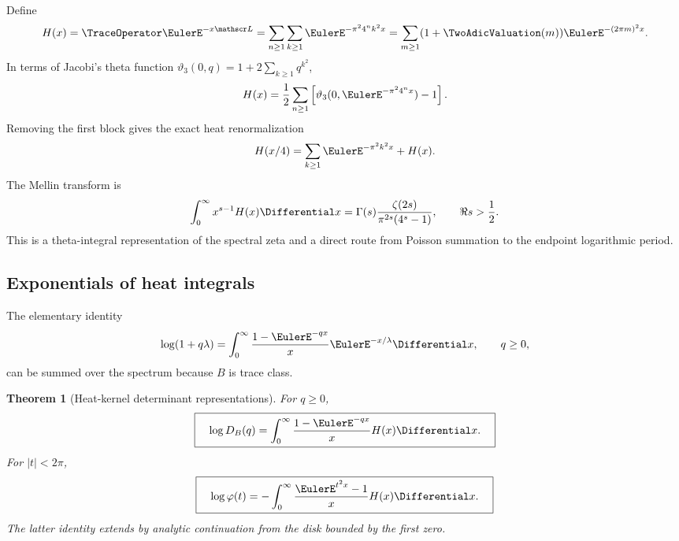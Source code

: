 \documentclass[11pt]{article}
\newtheorem{theorem}{Theorem}[section]
\theoremstyle{definition}
\theoremstyle{remark}
\newcommand{\phiF}{\varphi}
\begin{document}
Define
\begin{equation}
 H(x)=\TraceOperator\EulerE^{-x\mathscr L}
 =\sum_{n\ge1}\sum_{k\ge1}\EulerE^{-\pi^24^nk^2x}
 =\sum_{m\ge1}(1+\TwoAdicValuation(m))\EulerE^{-(2\pi m)^2x}.
 \label{p4:eq:heat-trace}
\end{equation}
In terms of Jacobi's theta function
\(\vartheta_3(0,q)=1+2\sum_{k\ge1}q^{k^2}\),
\begin{equation}
 H(x)=\frac12\sum_{n\ge1}
 \left[\vartheta_3(0,\EulerE^{-\pi^24^nx})-1\right].
 \label{p4:eq:theta-heat}
\end{equation}
Removing the first block gives the exact heat renormalization
\begin{equation}
 H(x/4)=\sum_{k\ge1}\EulerE^{-\pi^2k^2x}+H(x).
 \label{p4:eq:heat-renormalization}
\end{equation}
The Mellin transform is
\begin{equation}
 \int_0^\infty x^{s-1}H(x)\Differential x
 =\Gamma(s)\frac{\zeta(2s)}{\pi^{2s}(4^s-1)},
 \qquad \Re s>\frac12.
 \label{p4:eq:heat-Mellin}
\end{equation}
This is a theta-integral representation of the spectral zeta and a direct route from
Poisson summation to the endpoint logarithmic period.

\subsection{Exponentials of heat integrals}

The elementary identity
\begin{equation}
 \log(1+q\lambda)=\int_0^\infty
 \frac{1-\EulerE^{-qx}}x\EulerE^{-x/\lambda}\Differential x,
 \qquad q\ge0,
 \label{p4:eq:log-heat-elementary}
\end{equation}
can be summed over the spectrum because \(B\) is trace class.

\begin{theorem}[Heat-kernel determinant representations]
\label{p4:thm:heat-det}
For \(q\ge0\),
\begin{equation}
 \boxed{\quad
 \log D_B(q)=\int_0^\infty
 \frac{1-\EulerE^{-qx}}x H(x)\Differential x.
 \quad}
 \label{p4:eq:positive-heat-det}
\end{equation}
For \(|t|<2\pi\),
\begin{equation}
 \boxed{\quad
 \log\phiF(t)=-\int_0^\infty
 \frac{\EulerE^{t^2x}-1}{x}H(x)\Differential x.
 \quad}
 \label{p4:eq:real-heat-det}
\end{equation}
The latter identity extends by analytic continuation from the disk bounded by the first
zero.
\end{theorem}
\end{document}
